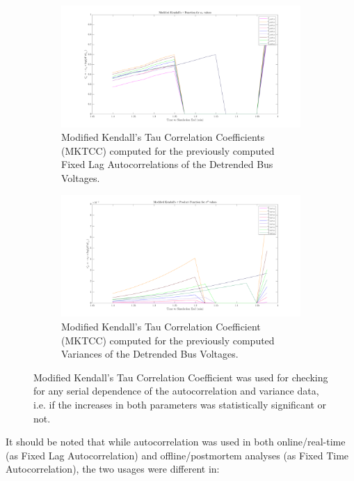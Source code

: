 \begin{figure}[!htpb]
	\begin{subfigure}{\textwidth}
		\centering
		\includegraphics[scale=0.25]{../figures/analysis_matlab/mktcc_ar1_run02}
		\caption{Modified Kendall's Tau Correlation Coefficients (MKTCC) computed for the previously computed Fixed Lag Autocorrelations of the Detrended Bus Voltages.}
	\end{subfigure}
	
	\begin{subfigure}{\textwidth}
		\centering
		\includegraphics[scale=0.25]{../figures/analysis_matlab/mktcc_var_run02}
		\caption{Modified Kendall's Tau Correlation Coefficient (MKTCC) computed for the previously computed Variances of the Detrended Bus Voltages.}
	\end{subfigure}
	
	\caption{Modified Kendall's Tau Correlation Coefficient was used for checking for any serial dependence of the autocorrelation and variance data, i.e. if the increases in both parameters was statistically significant or not.}
	\label{fig:mktccAutocorrAndVariance}
\end{figure}

It should be noted that while autocorrelation was used in both online/real-time (as Fixed Lag Autocorrelation) and offline/postmortem analyses (as Fixed Time Autocorrelation), the two usages were different in:

